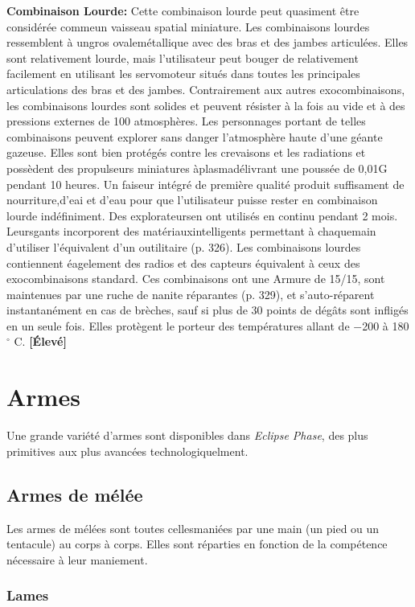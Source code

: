 \textbf{Combinaison Lourde:} Cette combinaison lourde peut quasiment être considérée commeun vaisseau spatial miniature. Les combinaisons lourdes ressemblent à ungros ovalemétallique avec des bras et des jambes articulées. Elles sont relativement lourde, mais l'utilisateur peut bouger de relativement facilement en utilisant les servomoteur situés dans toutes les principales articulations des bras et des jambes. Contrairement aux autres exocombinaisons, les combinaisons lourdes sont solides et peuvent résister à la fois au vide et à des pressions externes de 100 atmosphères. Les personnages portant de telles combinaisons peuvent explorer sans danger l'atmosphère haute d'une géante gazeuse. Elles sont bien protégés contre les crevaisons et les radiations et possèdent des propulseurs miniatures àplasmadélivrant une poussée de 0,01G pendant 10 heures. Un faiseur intégré de première qualité produit suffisament de nourriture,d'eai et d'eau pour que l'utilisateur puisse rester en combinaison lourde indéfiniment. Des explorateursen ont utilisés en continu pendant 2 mois. Leursgants incorporent des matériauxintelligents permettant à chaquemain d'utiliser l'équivalent d'un outilitaire (p. 326). Les combinaisons lourdes contiennent éagelement des radios et des capteurs équivalent à ceux des exocombinaisons standard. Ces combinaisons ont une Armure de 15/15, sont maintenues par une ruche de nanite réparantes (p. 329), et s'auto-réparent instantanément en cas de brèches, sauf si plus de 30 points de dégâts sont infligés en un seule fois. Elles protègent le porteur des températures allant de $-$200 à 180$^{\circ}$ C. \textbf{[Élevé]} 

\section{Armes} \label{sec:weapons} 

Une grande variété d'armes sont disponibles dans \emph{Eclipse Phase}, des plus primitives aux plus avancées technologiquelment. 

\subsection{Armes de mélée} \label{sec:melee-weapons} 

Les armes de mélées sont toutes cellesmaniées par une main (un pied ou un tentacule) au corps à corps. Elles sont réparties en fonction de la compétence nécessaire à leur maniement. 

\subsubsection{Lames} 

